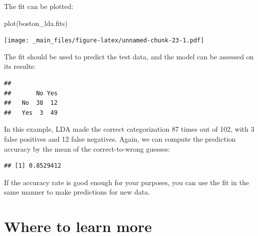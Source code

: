 \documentclass[
]{book}
\newenvironment{Shaded}{\begin{snugshade}}{\end{snugshade}}
\newcommand{\FunctionTok}[1]{\textcolor[rgb]{0.00,0.00,0.00}{#1}}
\newcommand{\NormalTok}[1]{#1}
\newcommand{\OtherTok}[1]{\textcolor[rgb]{0.56,0.35,0.01}{#1}}
\newcommand{\SpecialCharTok}[1]{\textcolor[rgb]{0.00,0.00,0.00}{#1}}
\begin{document}
The fit can be plotted:

\begin{Shaded}
\begin{Highlighting}[]
\FunctionTok{plot}\NormalTok{(boston\_lda.fits)}
\end{Highlighting}
\end{Shaded}

\texttt{[image: \_main\_files/figure-latex/unnamed-chunk-23-1.pdf]}

The fit should be used to predict the test data, and the model can be assessed on its results:

\begin{Shaded}
\end{Shaded}

\begin{verbatim}
##      
##       No Yes
##   No  38  12
##   Yes  3  49
\end{verbatim}

In this example, LDA made the correct categorization 87 times out of 102, with 3 false positives and 12 false negatives. Again, we can compute the prediction accuracy by the mean of the correct-to-wrong guesses:

\begin{Shaded}
\end{Shaded}

\begin{verbatim}
## [1] 0.8529412
\end{verbatim}

If the accuracy rate is good enough for your purposes, you can use the fit in the same manner to make predictions for new data.

\hypertarget{where-to-learn-more-3}{%
\section{Where to learn more}\label{where-to-learn-more-3}}
\end{document}
